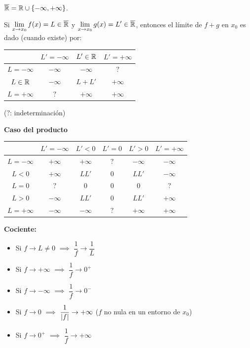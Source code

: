 \documentclass[11pt,a4paper]{article}
\newcommand{\Rbar}{\overline{\R}}
\begin{document}
\begin{definicion}
$\Rbar=\R\cup\{-\infty,+\infty\}$.
\end{definicion}

\begin{proposicion}
\end{proposicion}

\begin{proposicion}[Suma]
Si $\displaystyle\lim_{x\to x_0}f(x)=L\in\Rbar$ y $\displaystyle\lim_{x\to x_0}g(x)=L'\in\Rbar$, entonces el límite de $f+g$ en $x_0$ es dado (cuando existe) por:
\begin{center}
\renewcommand{\arraystretch}{1.3}
\begin{tabular}{c|ccc}
 & $L'=-\infty$ & $L'\in\mathbb{R}$ & $L'=+\infty$\\
\hline
$L=-\infty$ & $-\infty$ & $-\infty$ & $?$ \\
$L\in\mathbb{R}$ & $-\infty$ & $L+L'$ & $+\infty$ \\
$L=+\infty$ & $?$ & $+\infty$ & $+\infty$
\end{tabular}
\end{center}
($?$: indeterminación)
\end{proposicion}

\begin{center}
\begin{minipage}{\linewidth}
\textbf{Caso del producto}\par\medskip
\centering
\renewcommand{\arraystretch}{1.3}
\begin{tabular}{c|ccccc}
 & $L'=-\infty$ & $L'<0$ & $L'=0$ & $L'>0$ & $L'=+\infty$\\
\hline
$L=-\infty$ & $+\infty$ & $+\infty$ & $?$ & $-\infty$ & $-\infty$\\
$L<0$ & $+\infty$ & $LL'$ & $0$ & $LL'$ & $-\infty$\\
$L=0$ & $?$ & $0$ & $0$ & $0$ & $?$\\
$L>0$ & $-\infty$ & $LL'$ & $0$ & $LL'$ & $+\infty$\\
$L=+\infty$ & $-\infty$ & $-\infty$ & $?$ & $+\infty$ & $+\infty$
\end{tabular}
\end{minipage}
\end{center}

\textbf{Cociente:}
\begin{itemize}
  \item Si $f\to L\neq0$ $\implies$ $\dfrac1f\to\dfrac1L$
  \item Si $f\to+\infty$ $\implies$ $\dfrac1f\to0^+$
  \item Si $f\to-\infty$ $\implies$ $\dfrac1f\to0^-$
  \item Si $f\to0$ $\implies$ $\dfrac{1}{\lvert f\rvert}\to+\infty$ \quad ($f$ no nula en un entorno de $x_0$)
  \item Si $f\to0^+$ $\implies$ $\dfrac1f\to+\infty$
\end{itemize}
\end{document}

